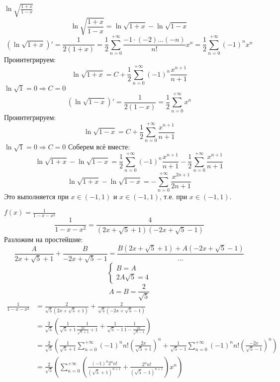 \begin{exercise}[2857]
    \(\ln \sqrt{\frac{1 + x}{1 - x}}\)
    \[\ln \sqrt{\frac{1 + x}{1 - x}} = \ln \sqrt{1 + x} - \ln \sqrt{1 - x}\]
    \[\left(\ln \sqrt{1 + x}\right)' = \frac{1}{2(1 + x)} = \frac{1}{2} \sum_{n = 0}^{+\infty} \frac{ - 1\cdot ( - 2) \dots (- n)}{n!} x^n = \frac{1}{2} \sum_{n = 0}^{+\infty} ( - 1)^n x^n\]
    Проинтегрируем:
    \[\ln \sqrt{1 + x} = C + \frac{1}{2} \sum_{n = 0}^{+\infty} ( - 1)^n \frac{x^{n + 1}}{n + 1}\]
    \(\ln \sqrt{1} = 0 \Rightarrow C = 0\)
    \[\left(\ln \sqrt{1 - x}\right)' = \frac{1}{2(1 - x)} = \frac{1}{2} \sum_{n = 0}^{+\infty} x^n \]
    Проинтегрируем:
    \[\ln \sqrt{1 - x} = C + \frac{1}{2} \sum_{n = 0}^{+\infty} \frac{x^{n + 1}}{n + 1}\]
    \(\ln \sqrt{1} = 0 \Rightarrow C = 0\)
    Соберем всё вместе:
    \[\ln \sqrt{1 + x} - \ln \sqrt{1 - x} = \frac{1}{2} \sum_{n = 0}^{+\infty} ( - 1)^n \frac{x^{n + 1}}{n + 1} - \frac{1}{2} \sum_{n = 0}^{+\infty} \frac{x^{n + 1}}{n + 1}\]
    \[\ln \sqrt{1 + x} - \ln \sqrt{1 - x} = -\sum_{n = 0}^{+\infty} \frac{x^{2n + 1}}{2n + 1}\]
    Это выполняется при \(x\in ( - 1, 1)\) и \(x\in ( - 1, 1)\), т.е. при \(x\in ( - 1, 1)\).
\end{exercise}

\begin{exercise}[2861]
    \(f(x) = \frac{1}{1 - x - x^2}\)
    \[\frac{1}{1 - x - x^2} = \frac{4}{(2x + \sqrt{5} + 1)( - 2x + \sqrt{5} - 1)}\]
    Разложим на простейшие:
    \[\frac{A}{2x + \sqrt{5} + 1} + \frac{B}{ - 2x + \sqrt{5} - 1} = \frac{B(2x + \sqrt{5} + 1) + A( - 2x + \sqrt{5} - 1)}{\dots}\]
    \[\begin{cases}
            B = A \\
            2A \sqrt{5} = 4
        \end{cases}\]
    \[A = B = \frac{2}{\sqrt{5}}\]
    \begin{align*}
        \frac{1}{1 - x - x^2} & = \frac{2}{\sqrt{5}(2x + \sqrt{5} + 1)} + \frac{2}{\sqrt{5}( -2x + \sqrt{5} - 1)}                                                                                                                                                             \\
                              & = \frac{2}{\sqrt{5}} \left( \frac{1}{\sqrt{5} + 1} \frac{1}{\frac{2x}{\sqrt{5} + 1} + 1} + \frac{1}{\sqrt{5} - 1} \frac{1}{1 - \frac{2x}{\sqrt{5} - 1}} \right)                                                                               \\
                              & = \frac{2}{\sqrt{5}} \left( \frac{1}{\sqrt{5} + 1} \sum_{n = 0}^{+\infty} ( - 1)^n n! \left( \frac{2x}{\sqrt{5} + 1} \right)^n + \frac{1}{\sqrt{5} - 1} \sum_{n = 0}^{+\infty} ( - 1)^n n! \left( \frac{ -2x}{\sqrt{5} - 1} \right)^n \right) \\
                              & = \frac{2}{\sqrt{5}} \left(\sum_{n = 0}^{+\infty} \left(\frac{( - 1)^n 2^n n!}{(\sqrt{5} + 1)^{n + 1}} + \frac{2^n n!}{(\sqrt{5} - 1)^{n + 1}} \right) x^n\right)                                                                             \\
    \end{align*}
\end{exercise}

